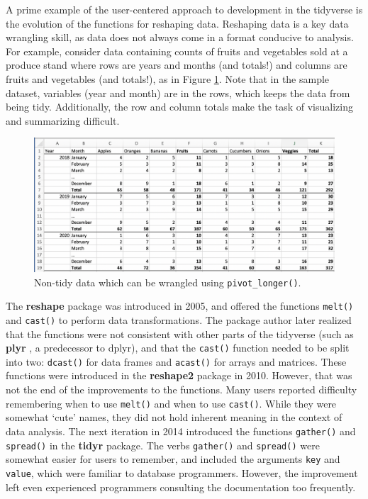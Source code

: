 \documentclass[12pt]{article}
\begin{document}
A prime example of the user-centered approach to development in the
tidyverse is the evolution of the functions for reshaping data.
Reshaping data is a key data wrangling skill, as data does not always
come in a format conducive to analysis. For example, consider data
containing counts of fruits and vegetables sold at a produce stand where
rows are years and months (and totals!) and columns are fruits and
vegetables (and totals!), as in Figure \ref{fig:fruitveggie}. Note that
in the sample dataset, variables (year and month) are in the rows, which
keeps the data from being tidy. Additionally, the row and column totals
make the task of visualizing and summarizing difficult.

\linespread{1}
\begin{figure}[H]

{\centering \includegraphics[width=0.95\linewidth]{images/fruitveggies} 

}

\caption{Non-tidy data which can be wrangled using \texttt{pivot\_longer()}.}\label{fig:fruitveggie}
\end{figure}\linespread{2}
\vspace{3mm}\setlength{\parindent}{15pt}

The \textbf{reshape} package \citep{R-reshape} was introduced in 2005,
and offered the functions \texttt{melt()} and \texttt{cast()} to perform
data transformations. The package author later realized that the
functions were not consistent with other parts of the tidyverse (such as
\textbf{plyr} \citep{R-plyr}, a predecessor to dplyr), and that the
\texttt{cast()} function needed to be split into two: \texttt{dcast()}
for data frames and \texttt{acast()} for arrays and matrices. These
functions were introduced in the \textbf{reshape2} \citep{R-reshape2}
package in 2010. However, that was not the end of the improvements to
the functions. Many users reported difficulty remembering when to use
\texttt{melt()} and when to use \texttt{cast()}. While they were
somewhat `cute' names, they did not hold inherent meaning in the context
of data analysis. The next iteration in 2014 introduced the functions
\texttt{gather()} and \texttt{spread()} in the \textbf{tidyr}
\citep{R-tidyr} package. The verbs \texttt{gather()} and
\texttt{spread()} were somewhat easier for users to remember, and
included the arguments \texttt{key} and \texttt{value}, which were
familiar to database programmers. However, the improvement left even
experienced programmers consulting the documentation too frequently.
\end{document}
